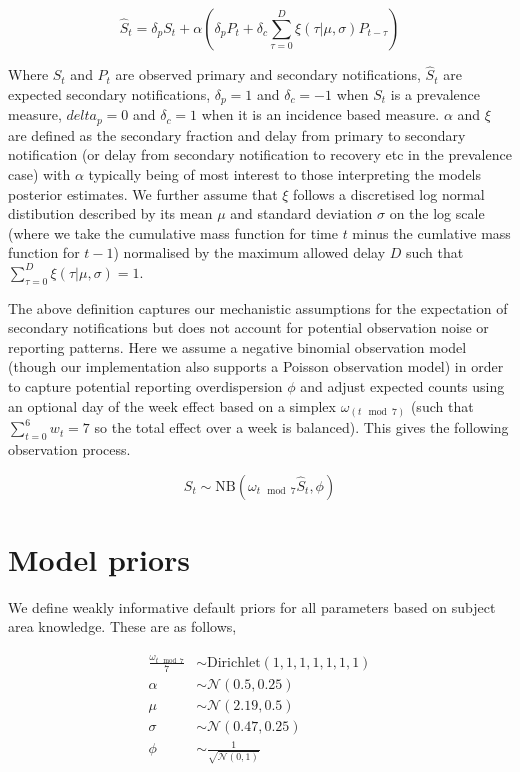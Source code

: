 \documentclass[
]{article}
\begin{document}
\begin{equation} 
    \hat{S}_{t} = \delta_p S_{t} + \alpha \left( \delta_p P_{t} + \delta_c \sum_{\tau = 0}^{D} \xi(\tau | \mu, \sigma) P_{t-\tau} \right)
\end{equation}

Where \(S_t\) and \(P_t\) are observed primary and secondary
notifications, \(\hat{S}_t\) are expected secondary notifications,
\(\delta_p = 1\) and \(\delta_c = -1\) when \(S_t\) is a prevalence
measure, \(delta_p = 0\) and \(\delta_c = 1\) when it is an incidence
based measure. \(\alpha\) and \(\xi\) are defined as the secondary
fraction and delay from primary to secondary notification (or delay from
secondary notification to recovery etc in the prevalence case) with
\(\alpha\) typically being of most interest to those interpreting the
models posterior estimates. We further assume that \(\xi\) follows a
discretised log normal distibution described by its mean \(\mu\) and
standard deviation \(\sigma\) on the log scale (where we take the
cumulative mass function for time \(t\) minus the cumlative mass
function for \(t-1\)) normalised by the maximum allowed delay \(D\) such
that \(\sum^D_{\tau=0}{ \xi(\tau | \mu, \sigma)} = 1\).

The above definition captures our mechanistic assumptions for the
expectation of secondary notifications but does not account for
potential observation noise or reporting patterns. Here we assume a
negative binomial observation model (though our implementation also
supports a Poisson observation model) in order to capture potential
reporting overdispersion \(\phi\) and adjust expected counts using an
optional day of the week effect based on a simplex
\(\omega_{(t \mod 7)}\) (such that \(\sum^6_{t=0}{w_t} = 7\) so the
total effect over a week is balanced). This gives the following
observation process.

\begin{equation} 
    S_{t} \sim \mathrm{NB}\left(\omega_{t \mod 7} \hat{S}_t,  \phi \right)
\end{equation}

\hypertarget{model-priors}{%
\section{Model priors}\label{model-priors}}

We define weakly informative default priors for all parameters based on
subject area knowledge. These are as follows,

\begin{align}
    \frac{\omega_{t \mod 7}}{7} &\sim \mathrm{Dirichlet}(1, 1, 1, 1, 1, 1, 1) \\
    \alpha &\sim \mathcal{N}(0.5, 0.25) \\
    \mu &\sim \mathcal{N}(2.19, 0.5) \\
\sigma &\sim \mathcal{N}(0.47, 0.25) \\
\phi &\sim \frac{1}{\sqrt{\mathcal{N}(0, 1)}}
\end{align}
\end{document}
